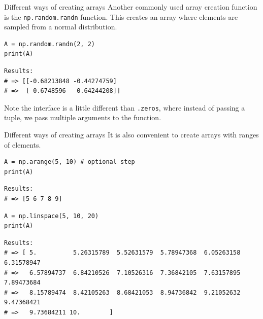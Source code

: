 \documentclass[10pt]{beamer}
\begin{document}
\begin{frame}[label={sec:org09c96f9},fragile]{Different ways of creating arrays}
 Another commonly used array creation function is the \texttt{np.random.randn} function. This
creates an array where elements are sampled from a normal distribution.

\begin{verbatim}
A = np.random.randn(2, 2)
print(A)
\end{verbatim}

\begin{verbatim}
Results: 
# => [[-0.68213848 -0.44274759]
# =>  [ 0.6748596   0.64244208]]
\end{verbatim}


\alert{Note} the interface is a little different than \texttt{.zeros}, where instead of passing a
tuple, we pass multiple arguments to the function.
\end{frame}

\begin{frame}[label={sec:org22b7243},fragile]{Different ways of creating arrays}
 It is also convenient to create arrays with ranges of elements.

\begin{verbatim}
A = np.arange(5, 10) # optional step
print(A)
\end{verbatim}

\begin{verbatim}
Results: 
# => [5 6 7 8 9]
\end{verbatim}


\begin{verbatim}
A = np.linspace(5, 10, 20)
print(A)
\end{verbatim}

\begin{verbatim}
Results: 
# => [ 5.          5.26315789  5.52631579  5.78947368  6.05263158  6.31578947
# =>   6.57894737  6.84210526  7.10526316  7.36842105  7.63157895  7.89473684
# =>   8.15789474  8.42105263  8.68421053  8.94736842  9.21052632  9.47368421
# =>   9.73684211 10.        ]
\end{verbatim}
\end{frame}
\end{document}

